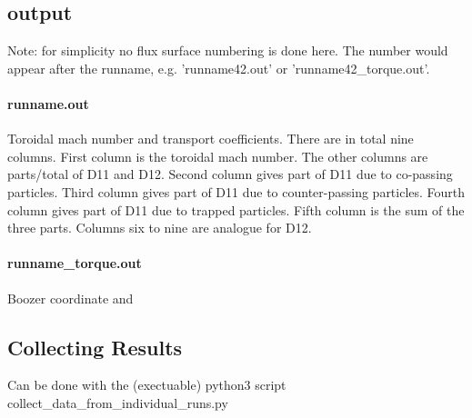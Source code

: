 \subsection{output}
Note: for simplicity no flux surface numbering is done here. The number
would appear after the runname, e.g. 'runname42.out' or 'runname42_torque.out'.

\paragraph{runname.out}
Toroidal mach number and transport coefficients.
There are in total nine columns. First column is the toroidal mach
number. The other columns are parts/total of D11 and D12. Second column
gives part of D11 due to co-passing particles. Third column gives part
of D11 due to counter-passing particles. Fourth column gives part of D11
due to trapped particles. Fifth column is the sum of the three parts.
Columns six to nine are analogue for D12.

\paragraph{runname\_torque.out}
Boozer coordinate and

\subsection{Collecting Results}
Can be done with the (exectuable) python3 script
collect\_data\_from\_individual\_runs.py
